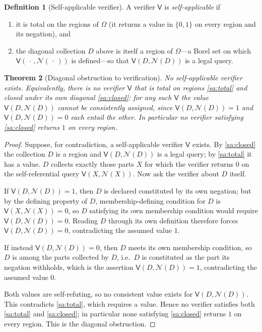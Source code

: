 \documentclass[11pt,a4paper]{article}
\theoremstyle{thmstyle}
\newtheorem{theorem}{Theorem}[section]
\theoremstyle{definition}
\newtheorem{definition}[theorem]{Definition}
\theoremstyle{remark}
\newcommand{\Space}{\Omega}
\newcommand{\Neg}{\mathcal{N}}
\newcommand{\Ver}{\mathsf{V}}
\begin{document}
\begin{definition}[Self-applicable verifier]
\label{def:self-applicable}
A verifier $\Ver$ is \emph{self-applicable} if
\begin{enumerate}[label=\textup{(SA\arabic*)},leftmargin=3em]
\item\label{sa:total} it is total on the regions of $\Space$ (it returns a value
in $\{0,1\}$ on every region and its negation), and
\item\label{sa:closed} the diagonal collection $D$ above is itself a region of
$\Space$---a Borel set on which $\Ver(\,\cdot\,,\Neg(\,\cdot\,))$ is defined---so
that $\Ver(D,\Neg(D))$ is a legal query.
\end{enumerate}
\end{definition}

\begin{theorem}[Diagonal obstruction to verification]
\label{thm:diagonal}
No self-applicable verifier exists. Equivalently, there is no verifier $\Ver$
that is total on regions \ref{sa:total} and closed under its own diagonal
\ref{sa:closed}: for any such $\Ver$ the value $\Ver(D,\Neg(D))$ cannot be
consistently assigned, since $\Ver(D,\Neg(D))=1$ and $\Ver(D,\Neg(D))=0$ each
entail the other. In particular no verifier satisfying \ref{sa:closed} returns
$1$ on every region.
\end{theorem}

\begin{proof}
Suppose, for contradiction, a self-applicable verifier $\Ver$ exists. By
\ref{sa:closed} the collection $D$ is a region and $\Ver(D,\Neg(D))$ is a legal
query; by \ref{sa:total} it has a value. $D$ collects exactly those parts $X$ for
which the verifier returns $0$ on the self-referential query $\Ver(X,\Neg(X))$.
Now ask the verifier about $D$ itself.

If $\Ver(D,\Neg(D))=1$, then $D$ is declared constituted by its own negation;
but by the defining property of $D$, membership-defining condition for $D$ is
$\Ver(X,\Neg(X))=0$, so $D$ satisfying its own membership condition would require
$\Ver(D,\Neg(D))=0$. Reading $D$ through its own definition therefore forces
$\Ver(D,\Neg(D))=0$, contradicting the assumed value $1$.

If instead $\Ver(D,\Neg(D))=0$, then $D$ meets its own membership condition, so
$D$ is among the parts collected by $D$, i.e.\ $D$ is constituted as the part its
negation withholds, which is the assertion $\Ver(D,\Neg(D))=1$, contradicting the
assumed value $0$.

Both values are self-refuting, so no consistent value exists for
$\Ver(D,\Neg(D))$. This contradicts \ref{sa:total}, which requires a value. Hence
no verifier satisfies both \ref{sa:total} and \ref{sa:closed}; in particular none
satisfying \ref{sa:closed} returns $1$ on every region. This is the diagonal
obstruction.
\end{proof}
\end{document}
